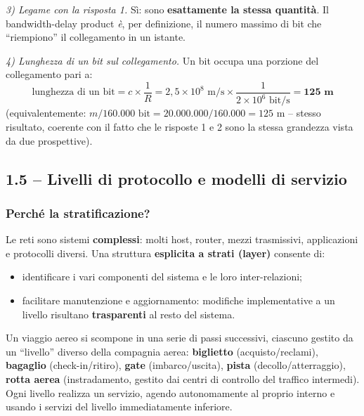 \documentclass[12pt, a4paper]{article}
\begin{document}
\begin{tcolorbox}[colback=orange!5, colframe=orange!70!black, title=\textbf{Esercizio 1.6 (P.25, Cap.\ 1 Kurose-Ross)}]
\textit{3) Legame con la risposta 1.} Sì: sono \textbf{esattamente la stessa quantità}. Il bandwidth-delay product \textit{è}, per definizione, il numero massimo di bit che ``riempiono'' il collegamento in un istante.

\textit{4) Lunghezza di un bit sul collegamento.} Un bit occupa una porzione del collegamento pari a:
$$\text{lunghezza di un bit} = c \times \frac{1}{R} = 2{,}5\times10^8 \text{ m/s} \times \frac{1}{2\times10^6 \text{ bit/s}} = \mathbf{125 \text{ m}}$$
(equivalentemente: $m / 160.000\text{ bit} = 20.000.000/160.000 = 125$ m -- stesso risultato, coerente con il fatto che le risposte 1 e 2 sono la stessa grandezza vista da due prospettive).
\end{tcolorbox}

\subsection{1.5 -- Livelli di protocollo e modelli di servizio}

\subsubsection{Perché la stratificazione?}

Le reti sono sistemi \textbf{complessi}: molti host, router, mezzi trasmissivi, applicazioni e protocolli diversi. Una struttura \textbf{esplicita a strati (layer)} consente di:
\begin{itemize}
    \item identificare i vari componenti del sistema e le loro inter-relazioni;
    \item facilitare manutenzione e aggiornamento: modifiche implementative a un livello risultano \textbf{trasparenti} al resto del sistema.
\end{itemize}

\begin{tcolorbox}[colback=teal!5, colframe=teal!60!black, title=\textbf{Analogia: l'organizzazione di un viaggio aereo}]
Un viaggio aereo si scompone in una serie di passi successivi, ciascuno gestito da un ``livello'' diverso della compagnia aerea: \textbf{biglietto} (acquisto/reclami), \textbf{bagaglio} (check-in/ritiro), \textbf{gate} (imbarco/uscita), \textbf{pista} (decollo/atterraggio), \textbf{rotta aerea} (instradamento, gestito dai centri di controllo del traffico intermedi). Ogni livello realizza un servizio, agendo autonomamente al proprio interno e usando i servizi del livello immediatamente inferiore.
\end{tcolorbox}
\end{document}
